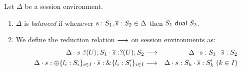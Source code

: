 
\begin{definition}\label{d:wtenvred}%
	Let $\Delta$ be a session environment.
	\begin{enumerate}[$\bullet$]
	\item  $\Delta$ is {\em balanced} if whenever
	$s: S_1, \overline{s}: S_2 \in \Delta$ then $S_1 \ \mathsf{dual}\  S_2$.
	\item We define the reduction relation $\longrightarrow$ on session environments as: %
\begin{eqnarray*}
	\Delta \cat s: \btout{U} S_1 \cat \dual{s}: \btinp{U} S_2  & \red & 
	\Delta \cat s: S_1 \cat \dual{s}: S_2  \\
	\Delta \cat s: \btsel{l_i: S_i}_{i \in I} \cat \dual{s}: \btbra{l_i: S_i'}_{i \in I} &\red& \Delta \cat s: S_k \cat \dual{s}: S_k' \ (k \in I)
\end{eqnarray*}
\end{enumerate}
\end{definition}

